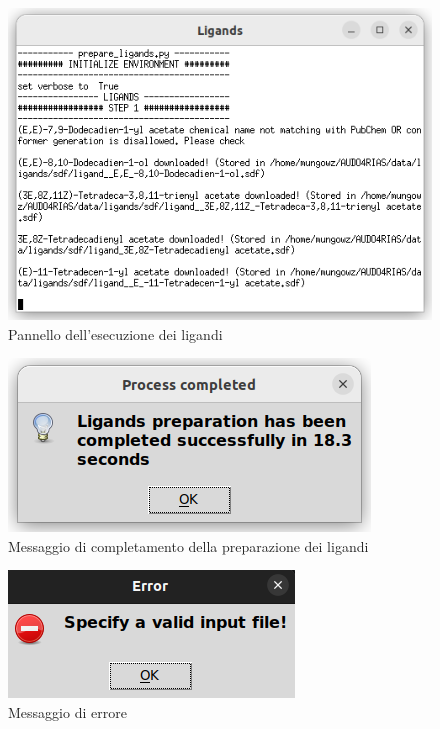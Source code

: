 \begin{figure}[H]
    \centering
    \includegraphics[scale=0.8]{immagini/capitolo3/ligandsExecution.png}
    \caption{Pannello dell'esecuzione dei ligandi}
    \label{fig:ligands execution}
\end{figure}

\begin{figure}[H]
    \centering
    \includegraphics{immagini/capitolo3/progressCompletedLigands.png}
    \caption{Messaggio di completamento della preparazione dei ligandi}
    \label{fig:progress completed ligands}
\end{figure}

\begin{figure}[H]
    \centering
    \includegraphics{immagini/capitolo3/invalidInputLigands.png}
    \caption{Messaggio di errore}
    \label{fig:invalid input ligands}
\end{figure}

